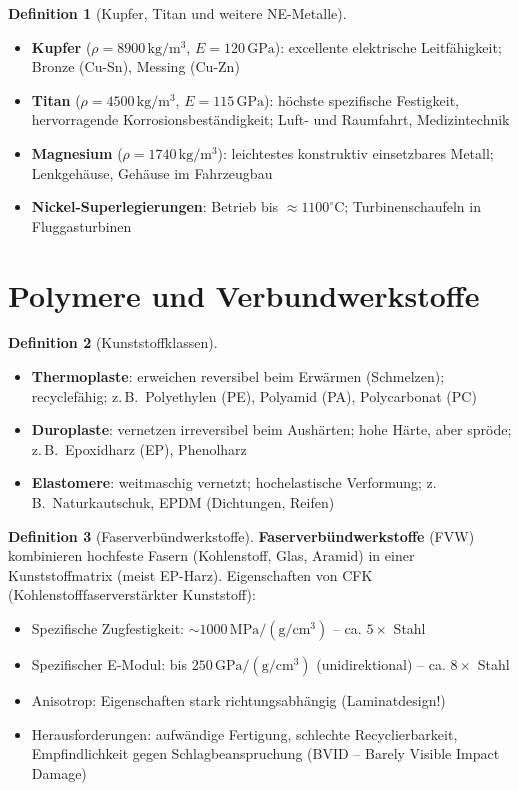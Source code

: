 ﻿\documentclass[a4paper,12pt]{report}
\theoremstyle{definition}
\newtheorem{definition}{Definition}
\begin{document}
\begin{definition}[Kupfer, Titan und weitere NE-Metalle]
\begin{itemize}
    \item[-] \textbf{Kupfer} ($\rho = 8900\,\mathrm{kg/m^3}$, $E = 120\,\mathrm{GPa}$):
          excellente elektrische Leitf\"ahigkeit; Bronze (Cu-Sn), Messing (Cu-Zn)
    \item[-] \textbf{Titan} ($\rho = 4500\,\mathrm{kg/m^3}$, $E = 115\,\mathrm{GPa}$):
          h\"ochste spezifische Festigkeit, hervorragende Korrosionsbest\"andigkeit;
          Luft- und Raumfahrt, Medizintechnik
    \item[-] \textbf{Magnesium} ($\rho = 1740\,\mathrm{kg/m^3}$): leichtestes
          konstruktiv einsetzbares Metall; Lenkgeh\"ause, Geh\"ause im Fahrzeugbau
    \item[-] \textbf{Nickel-Superlegierungen}: Betrieb bis $\approx 1100^\circ\mathrm{C}$;
          Turbinenschaufeln in Fluggasturbinen
\end{itemize}
\end{definition}

\section{Polymere und Verbundwerkstoffe}

\begin{definition}[Kunststoffklassen]
\begin{itemize}
    \item[-] \textbf{Thermoplaste}: erweichen reversibel beim Erw\"armen (Schmelzen);
          recyclef\"ahig; z.\,B.\ Polyethylen (PE), Polyamid (PA), Polycarbonat (PC)
    \item[-] \textbf{Duroplaste}: vernetzen irreversibel beim Aush\"arten;
          hohe H\"arte, aber spr\"ode; z.\,B.\ Epoxidharz (EP), Phenolharz
    \item[-] \textbf{Elastomere}: weitmaschig vernetzt; hochelastische Verformung;
          z.\,B.\ Naturkautschuk, EPDM (Dichtungen, Reifen)
\end{itemize}
\end{definition}

\begin{definition}[Faserverb\"undwerkstoffe]
\textbf{Faserverb\"undwerkstoffe} (FVW) kombinieren hochfeste Fasern
(Kohlenstoff, Glas, Aramid) in einer Kunststoffmatrix (meist EP-Harz).
Eigenschaften von CFK (Kohlenstofffaserverst\"arkter Kunststoff):
\begin{itemize}
    \item[-] Spezifische Zugfestigkeit: $\sim 1000\,\mathrm{MPa/(g/cm^3)}$ -- ca. $5\times$ Stahl
    \item[-] Spezifischer E-Modul: bis $250\,\mathrm{GPa/(g/cm^3)}$ (unidirektional) -- ca. $8\times$ Stahl
    \item[-] Anisotrop: Eigenschaften stark richtungsabh\"angig (Laminatdesign!)
    \item[-] Herausforderungen: aufw\"andige Fertigung, schlechte Recyclierbarkeit,
          Empfindlichkeit gegen Schlagbeanspruchung (BVID -- Barely Visible Impact Damage)
\end{itemize}
\end{definition}
\end{document}
